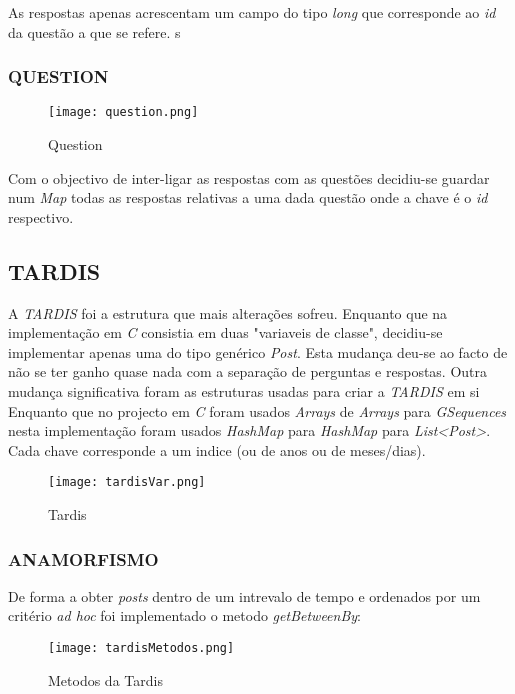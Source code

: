 \documentclass[letterpaper, 10 pt, conference]{IEEEtran} %
\begin{document}
As respostas apenas acrescentam um campo do tipo \textit{long} que corresponde ao \textit{id} da questão a que se refere.
s
\subsubsection{QUESTION}
\begin{figure}[h!]
  \centering
  \texttt{[image: question.png]}
   \caption{Question}
\end{figure}

Com o objectivo de inter-ligar as respostas com as questões decidiu-se guardar num \textit{Map} todas as respostas relativas a uma dada questão onde a chave é o \textit{id} respectivo.

\subsection{TARDIS}

A \textit{TARDIS} foi a estrutura que mais alterações sofreu.
Enquanto que na implementação em \textit{C} consistia em duas "variaveis de classe", decidiu-se implementar apenas uma do tipo genérico \textit{Post}. Esta mudança deu-se ao facto de não se ter ganho quase nada com a separação de perguntas e respostas.
Outra mudança significativa foram as estruturas usadas para criar a \textit{TARDIS} em si Enquanto que no projecto em \textit{C} foram usados \textit{Arrays} de \textit{Arrays} para \textit{GSequences} nesta implementação foram usados \textit{HashMap} para \textit{HashMap} para \textit{List<Post>}. Cada chave corresponde a um indice (ou de anos ou de meses/dias).

\begin{figure}[h!]
  \centering
  \texttt{[image: tardisVar.png]}
   \caption{Tardis}
\end{figure}

\subsubsection{ANAMORFISMO}

De forma a obter \textit{posts} dentro de um intrevalo de tempo e ordenados por um critério \textit{ad hoc}  foi implementado o metodo \textit{getBetweenBy}:

\begin{figure}[h!]
  \centering
  \texttt{[image: tardisMetodos.png]}
   \caption{Metodos da Tardis}
\end{figure}
\end{document}
